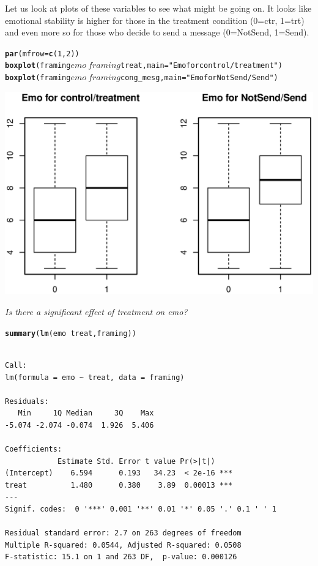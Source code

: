 \documentclass{article}\usepackage{graphicx, color}
\makeatletter
\newcommand{\hlfunctioncall}[1]{\textcolor[rgb]{0.501960784313725,0,0.329411764705882}{\textbf{#1}}}%
\newcommand{\hlstring}[1]{\textcolor[rgb]{0.6,0.6,1}{#1}}%
\newenvironment{kframe}{%
 \def\at@end@of@kframe{}%
 \ifinner\ifhmode%
  \def\at@end@of@kframe{\end{minipage}}%
  \begin{minipage}{\columnwidth}%
 \fi\fi%
 \def\FrameCommand##1{\hskip\@totalleftmargin \hskip-\fboxsep
 \colorbox{shadecolor}{##1}\hskip-\fboxsep
     \hskip-\linewidth \hskip-\@totalleftmargin \hskip\columnwidth}%
 \MakeFramed {\advance\hsize-\width
   \@totalleftmargin\z@ \linewidth\hsize
   \@setminipage}}%
 {\par\unskip\endMakeFramed%
 \at@end@of@kframe}
\newenvironment{knitrout}{}{} %
\makeatother
\begin{document}
Let us look at plots of these variables to see what might be going on. It looks like emotional stability is higher for those in the treatment condition (0=ctr, 1=trt) and even more so for those who decide to send a message (0=NotSend, 1=Send).
\begin{knitrout}
\color{fgcolor}\begin{kframe}
\begin{alltt}
\hlfunctioncall{par}(mfrow=\hlfunctioncall{c}(1,2))
\hlfunctioncall{boxplot}(framing$emo~framing$treat, main=\hlstring{"Emo for control/treatment"})
\hlfunctioncall{boxplot}(framing$emo~framing$cong_mesg, main=\hlstring{"Emo for NotSend/Send"})
\end{alltt}
\end{kframe}

{\centering \includegraphics[width=\linewidth]{plots/unnamed-chunk-7} 

}



\end{knitrout}

\emph{Is there a significant effect of treatment on emo?}
\begin{knitrout}
\color{fgcolor}\begin{kframe}
\begin{alltt}
\hlfunctioncall{summary}(\hlfunctioncall{lm}(emo ~ treat,framing))
\end{alltt}
\begin{verbatim}

Call:
lm(formula = emo ~ treat, data = framing)

Residuals:
   Min     1Q Median     3Q    Max 
-5.074 -2.074 -0.074  1.926  5.406 

Coefficients:
            Estimate Std. Error t value Pr(>|t|)    
(Intercept)    6.594      0.193   34.23  < 2e-16 ***
treat          1.480      0.380    3.89  0.00013 ***
---
Signif. codes:  0 '***' 0.001 '**' 0.01 '*' 0.05 '.' 0.1 ' ' 1 

Residual standard error: 2.7 on 263 degrees of freedom
Multiple R-squared: 0.0544,	Adjusted R-squared: 0.0508 
F-statistic: 15.1 on 1 and 263 DF,  p-value: 0.000126 
\end{verbatim}
\end{kframe}
\end{knitrout}
\end{document}

